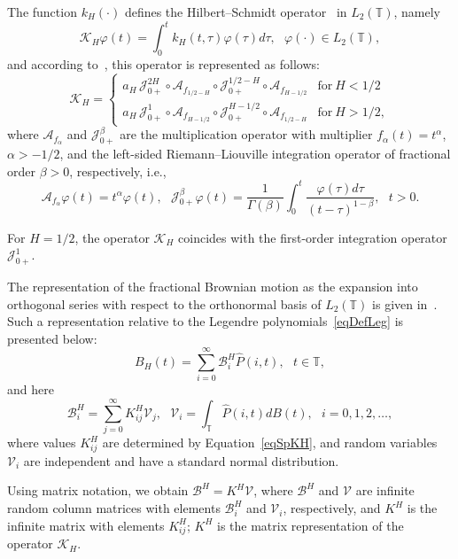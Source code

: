 \documentclass[10pt,reqno]{amsart}
\theoremstyle{plain}
\theoremstyle{remark}
\renewcommand{\phi}{\varphi}
\newcommand{\ca}{\mathcal{A}}
\newcommand{\cb}{\mathcal{B}}
\newcommand{\cj}{\mathcal{J}}
\newcommand{\ck}{\mathcal{K}}
\newcommand{\cv}{\mathcal{V}}
\newcommand{\LPT}{{L_2(\mathds{T})}}
\begin{document}
The function $k_H(\cdot)$ defines the Hilbert--Schmidt operator~\cite{Bal_80} in $\LPT$, namely
\begin{equation}\label{eqLinearIO}
  \ck_H \phi(t) = \int_0^{t} k_H(t,\tau) \phi(\tau) d\tau, \ \ \ \phi(\cdot) \in \LPT,
\end{equation}
and according to~\cite{DecUst_PA99}, this operator is represented as follows:
\begin{equation}\label{eqDefFBMFiniteOper}
  \ck_H = \left\{
    \begin{array}{ll}
      a_H \, \cj_{0+}^{2H} \circ \ca_{f_{1/2-H}} \circ \cj_{0+}^{1/2-H} \circ \ca_{f_{H-1/2}} & \text{for} ~ H < 1/2 \\
      a_H \, \cj_{0+}^1 \circ \ca_{f_{H-1/2}} \circ \cj_{0+}^{H-1/2} \circ \ca_{f_{1/2-H}} & \text{for} ~ H > 1/2,
    \end{array}
  \right.
\end{equation}
where $\ca_{f_\alpha}$ and $\cj_{0+}^\beta$ are the multiplication operator with multiplier $f_\alpha(t) = t^\alpha$, $\alpha > -1/2$, and the left-sided Riemann--Liouville integration operator of fractional order $\beta > 0$, respectively, i.e.,
\[
  \ca_{f_\alpha} \phi(t) = t^\alpha \phi(t), \ \ \ \cj_{0+}^\beta \phi(t) = \frac{1}{\Gamma(\beta)} \int_0^t {\frac{\phi(\tau) d\tau}{(t-\tau)^{1-\beta}}}, \ \ \ t > 0.
\]

For $H = 1/2$, the operator $\ck_H$ coincides with the first-order integration operator $\cj_{0+}^1$.

The representation of the fractional Brownian motion as the expansion into orthogonal series with respect to the orthonormal basis of $\LPT$ is given in~\cite{Ryb_Comp25}. Such a representation relative to the Legendre polynomials~\eqref{eqDefLeg} is presented below:
\begin{equation}\label{eqSpFBMFinite}
  B_H(t) = \sum\limits_{i=0}^\infty \cb_i^H \hat P(i,t), \ \ \ t \in \mathds{T},
\end{equation}
and here
\begin{equation}\label{eqSpFBMCoef}
  \cb_i^H = \sum\limits_{j=0}^\infty K_{ij}^H \cv_j, \ \ \ \cv_i = \int_\mathds{T} {\hat P(i,t) dB(t)}, \ \ \ i = 0,1,2,\dots,
\end{equation}
where values $K_{ij}^H$ are determined by Equation~\eqref{eqSpKH}, and random variables $\cv_i$ are independent and have a standard normal distribution.

Using matrix notation, we obtain $\cb^H = K^H \cv$, where $\cb^H$ and $\cv$ are infinite random column matrices with elements $\cb_i^H$ and $\cv_i$, respectively, and $K^H$ is the infinite matrix with elements $K_{ij}^H$; $K^H$ is the matrix representation of the operator $\ck_H$.
\end{document}
